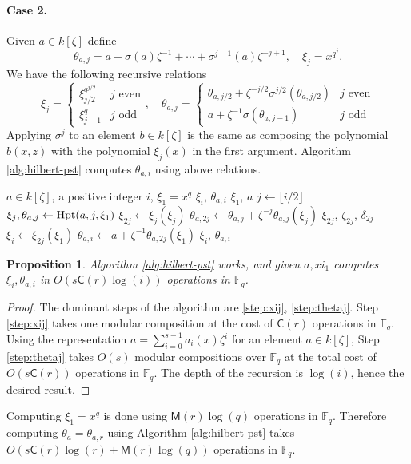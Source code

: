 \documentclass[12pt]{article}
\theoremstyle{plain}
\newtheorem{proposition}[theorem]{Proposition}
\theoremstyle{definition}
\def\F{\ensuremath{\mathbb{F}}}
\def\MM{\ensuremath{\mathsf{M}}}
\def\CC{\ensuremath{\mathsf{C}}}
\newcounter{algorithm}
\begin{document}
\paragraph{Case 2.} 
Given $a \in k[\zeta]$ define 
\[ \theta_{a, j} = a + \sigma(a)\zeta^{-1} + \cdots + \sigma^{j - 1}(a)\zeta^{-j + 1}, \quad \xi_j 
= x^{q^j}. \]
We have the following recursive relations
\[
\xi_j = 
\begin{cases}
\xi_{j / 2}^{q^{j / 2}} & j \text{ even} \\
\xi_{j - 1}^q & j \text{ odd}
\end{cases}, \quad
\theta_{a, j} = 
\begin{cases}
\theta_{a, j / 2} + \zeta^{-j / 2}\sigma^{j / 2}(\theta_{a, j / 2})& j \text{ even} \\
a + \zeta^{-1}\sigma(\theta_{a, j - 1}) & j \text{ odd}
\end{cases}
\]
Applying $\sigma^j$ to an element $b \in k[\zeta]$ is the same as composing the polynomial $b(x, 
z)$ with the polynomial $\xi_j(x)$ in the first argument. Algorithm \ref{alg:hilbert-pst} computes 
$\theta_{a, i}$ using above relations.

\begin{algorithm}
	\label{alg:hilbert-pst}
	\begin{algorithmic}[1]
		\REQUIRE $a \in k[\zeta]$, a positive integer $i$, $\xi_1=x^q$
		\ENSURE $\xi_i$, $\theta_{a, i}$
		\RETURN $\xi_1$, $a$
		\ENDIF
		\STATE $j \leftarrow \lfloor i / 2 \rfloor$
		\STATE $\xi_{j},\theta_{a, j} \leftarrow {\rm Hpt}(a, j, \xi_1)$ 
		\STATE\label{step:xij} $\xi_{2j} \leftarrow \xi_j(\xi_j)$
		\STATE\label{step:thetaj} $\theta_{a, 2j} \leftarrow \theta_{a, j} + \zeta^{-j}\theta_{a, 
			j}(\xi_j)$
		\RETURN $\xi_{2j}$, $\zeta_{2j}$, $\delta_{2j}$
		\ENDIF
		\STATE $\xi_i \leftarrow \xi_{2j}(\xi_1)$
		\STATE $\theta_{a, i} \leftarrow a + \zeta^{-1}\theta_{a, 2j}(\xi_1)$
		\RETURN $\xi_i$, $\theta_{a, i}$
	\end{algorithmic}
\end{algorithm}

\begin{proposition}
	\label{prop:xitheta}
	Algorithm \ref{alg:hilbert-pst} works, and given $a,xi_1$ computes $\xi_i, \theta_{a, i}$ in  
	$O(s\CC(r)\log(i))$ operations in $\F_q$.
\end{proposition}
\begin{proof}
	The dominant steps of the algorithm are \ref{step:xij}, \ref{step:thetaj}. Step \ref{step:xij} 
	takes one modular composition at the cost of $\CC(r)$ operations in $\F_q$. Using the 
	representation $a = \sum_{i = 0}^{s - 1}a_i(x)\zeta^i$ for an element $a \in k[\zeta]$, Step 
	\ref{step:thetaj} takes $O(s)$ modular compositions over $\F_q$ at the total cost of 
	$O(s\CC(r))$ operations in $\F_q$. The depth of the recursion is $\log(i)$, hence the desired 
	result.
\end{proof}
Computing $\xi_1 = x^q$ is done using $\MM(r)\log(q)$ operations in $\F_q$. Therefore computing 
$\theta_a = \theta_{a, r}$ using Algorithm \ref{alg:hilbert-pst} takes $O(s\CC(r)\log(r) + 
\MM(r)\log(q))$ operations in $\F_q$.
\end{document}

